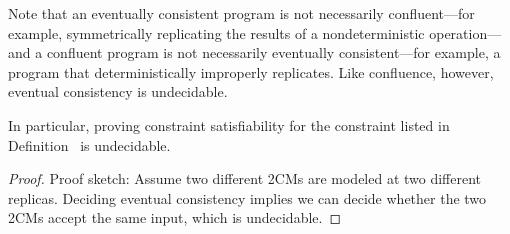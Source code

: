 
Note that an eventually consistent program is not necessarily confluent---for example, symmetrically replicating the results of a nondeterministic operation---and a confluent program is not necessarily eventually consistent---for example, a program that deterministically improperly replicates.  Like confluence, however, eventual consistency is undecidable.



\begin{lemma}
In particular, proving constraint satisfiability for the constraint listed in Definition~\label{def:ec} is undecidable.
\end{lemma}
\begin{proof}
Proof sketch: Assume two different 2CMs are modeled at two different replicas.  Deciding eventual consistency implies we can decide whether the two 2CMs accept the same input, which is undecidable.
\end{proof}


%

